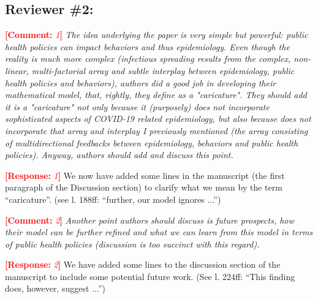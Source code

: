 \documentclass[12pt]{article}
\newcommand{\comment}{\showcomment}
\newcommand{\showcomment}[3]{\textcolor{#1}{\textbf{[#2: }\textsl{#3}\textbf{]}}}
\DeclareRobustCommand\_{\ifmmode\expandafter\subtxt\else\textunderscore\fi}
\newcommand{\com}[1]{\comment{red}{Comment}{#1}} %
\newcommand{\res}[1]{\comment{red}{Response}{#1}} %
\begin{document}
\subsection*{Reviewer \#2:}
\com 1 
{\it The idea underlying the paper is very simple but powerful: public health policies can impact behaviors and thus epidemiology. Even though the reality is much more complex (infectious spreading results from the complex, non-linear, multi-factorial array and subtle interplay between epidemiology, public health policies and behaviors), authors did a good job in developing their mathematical model, that, rightly, they define as a "caricature". They should add it is a "caricature" not only because it (purposely) does not incorporate sophisticated aspects of COVID-19 related epidemiology, but also because does not incorporate that array and interplay I previously mentioned (the array consisting of multidirectional feedbacks between epidemiology, behaviors and public health policies). Anyway, authors should add and discuss this point.}

\res 1
We now have added some lines in the manuscript (the first paragraph of the Discussion section) to clarify what we mean by the term ``caricature''. (see l. 188ff: ``further, our model ignores ...'')

\com 2 
{\it Another point authors should discuss is future prospects, how their model can be further refined and what we can learn from this model in terms of public health policies (discussion is too succinct with this regard).}

\res 2
We have added some lines to the discussion section of the manuscript to include some potential future work. (See l. 224ff: ``This finding does, however, suggest ...'')
\end{document}
